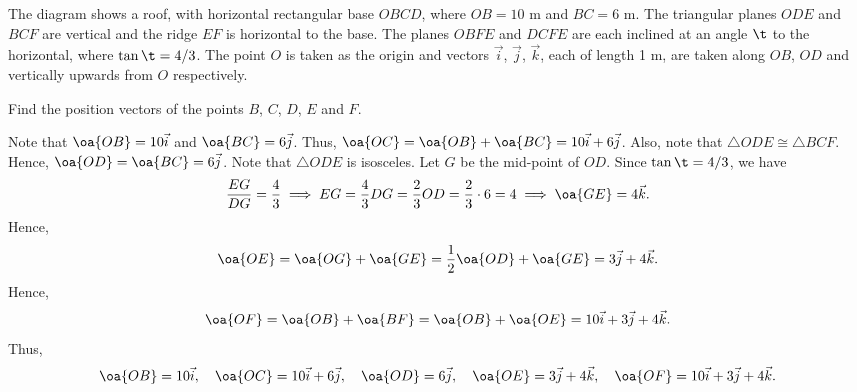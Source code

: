 \clearpage
\begin{problem}
    The diagram shows a roof, with horizontal rectangular base $OBCD$, where $OB = 10$ m and $BC = 6$ m. The triangular planes $ODE$ and $BCF$ are vertical and the ridge $EF$ is horizontal to the base. The planes $OBFE$ and $DCFE$ are each inclined at an angle $\t$ to the horizontal, where $\tan \t = 4/3$. The point $O$ is taken as the origin and vectors $\vec i$, $\vec j$, $\vec k$, each of length 1 m, are taken along $OB$, $OD$ and vertically upwards from $O$ respectively.

    \begin{center}
    \end{center}

    Find the position vectors of the points $B$, $C$, $D$, $E$ and $F$.
\end{problem}
\begin{solution}
    Note that $\oa{OB} = 10 \vec i$ and $\oa{BC} =  6 \vec j$. Thus, $\oa{OC} = \oa{OB} + \oa{BC} = 10 \vec i + 6 \vec j$. Also, note that $\triangle ODE \cong \triangle BCF$. Hence, $\oa{OD} = \oa{BC} = 6 \vec j$. Note that $\triangle ODE$ is isosceles. Let $G$ be the mid-point of $OD$. Since $\tan \t = 4/3$, we have \[\frac{EG}{DG} = \frac43 \implies EG = \frac43 DG = \frac23 OD = \frac23 \cdot 6 = 4 \implies \oa{GE} = 4\vec k.\] Hence, \[\oa{OE} = \oa{OG} + \oa{GE} = \frac12 \oa{OD} + \oa{GE} = 3\vec j + 4 \vec k.\] Hence, \[\oa{OF} = \oa{OB} + \oa{BF} = \oa{OB} + \oa{OE} = 10 \vec i + 3 \vec j + 4 \vec k.\] Thus, \[\oa{OB} = 10 \vec i, \quad \oa{OC} = 10 \vec i + 6 \vec j, \quad \oa{OD} = 6 \vec j, \quad \oa{OE} = 3 \vec j + 4 \vec k, \quad \oa{OF} = 10 \vec i + 3 \vec j + 4 \vec k.\]
\end{solution}

